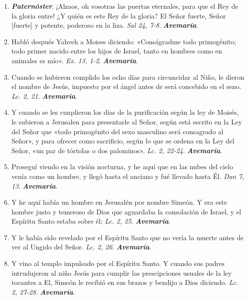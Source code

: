 \documentclass[./rosary.tex]{subfiles}
\begin{document}
\begin{enumerate}
    \item \textbf{\emph{Paternóster}}. ¡Alzaos, oh vosotras las puertas eternales, para que el Rey de la gloria entre!
          ¿Y quién es este Rey de la gloria? El Señor fuerte, Señor [fuerte] y potente, poderoso en la liza. \emph{Sal 24, 7-8}. \textbf{\emph{Avemaría}}.

    \item Habló después Yahveh a Moises diciendo: «Conságradme todo primogénito; todo primer nacido entre los hijos de Israel, tanto en hombres como en animales es mío».
          \emph{Ex. 13, 1-2}. \textbf{\emph{Avemaría}}.

    \item Cuando se hubieron complido los ocho días para circuncidar al Niño, le dieron el nombre de Jesús, impuesto por el ángel antes de será concebido en el seno.
          \emph{Lc. 2, 21}. \textbf{\emph{Avemaría}}.

    \item Y cuando se les cunplieron los días de la purificación según la ley de Moisés, le subieron a Jerusalen para presentarle al Señor,
          según está escrito en la Ley del Señor que «todo primogénito del sexo masculino será consagrado al Señor»,
          y para ofrecer como sacrificio, según lo que se ordena en la Ley del Señor, «un par de tórtolas o dos palominos». \emph{Lc. 2, 22-24}. \textbf{\emph{Avemaría}}.

    \item Proseguí viendo en la visión nocturna, y he aquí que en las nubes del cielo venía como un hombre, y llegó hasta el anciano y fué llevado hasta Él.
          \emph{Dan 7, 13}. \textbf{\emph{Avemaría}}.

    \item Y he aquí había un hombre en Jerusalén por nombre Simeón. Y era este hombre justo y temeroso de Dios que aguardaba la consolación de Israel,
          y el Espíritu Santo estaba sobre él; \emph{Lc. 2, 25}. \textbf{\emph{Avemaría}}.

    \item Y le había sido revelado por el Espíritu Santo que no vería la muerte antes de ver al Ungido del Señor. \emph{Lc. 2, 26}. \textbf{\emph{Avemaría}}.

    \item Y vino al templo impulsado por el Espíritu Santo. Y cuando sus padres intrudujeron al niño Jesús para cumplir
          las prescipciones usuales de la ley tocantes a El, Simeón le recibió en sus brazos y bendijo a Dios diciendo. \emph{Lc. 2, 27-28}. \textbf{\emph{Avemaría}}.


\end{enumerate}
\end{document}
